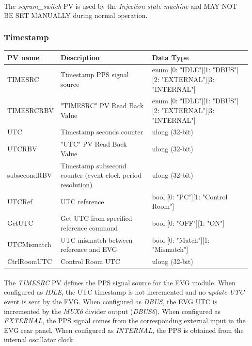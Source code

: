 \documentclass[openany]{article}
\begin{document}
			\paragraph{} The \emph{seqram\_switch} PV is used by the \emph{Injection state machine} and MAY NOT BE SET MANUALLY during normal operation.

		\subsubsection{Timestamp}\label{pvgroup:evg-timestamp}
			\begin{center}
			\begin{tabular}{| m{2.8cm} m{6cm} m{6cm} |}
			    \hline
			    \bfseries PV name & \bfseries Description & \bfseries Data Type \\ \hline
			    TIMESRC & Timestamp PPS signal source & enum [0: "IDLE"][1: "DBUS"][2: "EXTERNAL"][3: "INTERNAL"] \\ \hline
			    TIMESRCRBV & "TIMESRC" PV Read Back Value & enum [0: "IDLE"][1: "DBUS"][2: "EXTERNAL"][3: "INTERNAL"] \\ \hline
			    UTC & Timestamp seconds counter & ulong (32-bit) \\ \hline
			    UTCRBV & "UTC" PV Read Back Value & ulong (32-bit) \\ \hline
			    subsecondRBV & Timestamp subsecond counter (event clock period resolution) & ulong (32-bit) \\ \hline
			    UTCRef & UTC reference & bool [0: "PC"][1: "Control Room"] \\ \hline
			    GetUTC & Get UTC from specified reference command & bool [0: "OFF"][1: "ON"] \\ \hline
			    UTCMismatch & UTC mismatch between reference and EVG & bool [0: "Match"][1: "Mismatch"] \\ \hline
			    CtrlRoomUTC & Control Room UTC & ulong (32-bit) \\ \hline
			\end{tabular}
			\end{center}

			\paragraph{} The \emph{TIMESRC} PV defines the PPS signal source for the EVG module. When configured as \emph{IDLE}, the UTC timestamp is not incremented and no \emph{update UTC} event is sent by the EVG. When configured as \emph{DBUS}, the EVG UTC is incremented by the \emph{MUX6} divider output (\emph{DBUS6}). When configured as \emph{EXTERNAL}, the PPS signal comes from the corresponding external input in the EVG rear panel. When configured as \emph{INTERNAL}, the PPS is obtained from the internal oscillator clock.
\end{document}
